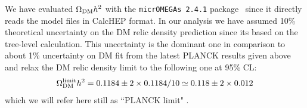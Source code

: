 \documentclass[12pt,a4paper]{article}
\newcommand {\blue} {\color{blue}}
\newcommand{\tcb}[1]{{\blue  #1}}
\begin{document}
We have evaluated $\Omega_{\rm DM} h^2$ with the
{\texttt{micrOMEGAs 2.4.1}} package~\cite{Belanger:2013oya,Belanger:2006is, Belanger:2010gh}
since it directly reads the model files in CalcHEP format.
\tcb{In our analysis we have assumed 10\% theoretical uncertainty  on the DM relic density prediction since its  based on the tree-level calculation. This uncertainty is the dominant one in comparison to about 1\% uncertainty on DM fit from the latest PLANCK results given above and relax the DM relic density limit 
to the following one at 95\% CL:
\begin{equation}
\Omega_{\rm DM}^{\rm limit} h^2=0.1184\pm 2\times 0.1184/10
\simeq 0.118\pm 2\times 0.012
\label{eq:planck-limit-relaxed}
\end{equation}
which we will refer here still as  ``PLANCK limit" .
}
\end{document}
